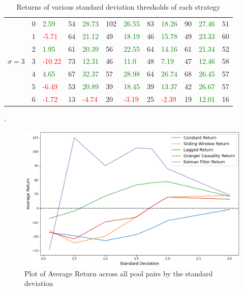 \begin{table}[!htb]
\begin{adjustwidth}{-0.8in}{-0.9in}
\begin{tabular}{|p{4em}|p{2em}|p{3em}|p{3em}|p{3em}|p{3em}|p{3em}|p{3em}|p{3em}|p{3em}|p{3em}|p{3em}|}
            & 0 & \textcolor{green}{2.59} & 54 & \textcolor{green}{28.73} & 102 & \textcolor{green}{26.55} & 83 & \textcolor{green}{18.26} & 90 & \textcolor{green}{27.46} & 51\\\cline{3-12}
            & 1 & \textcolor{red}{-5.71} & 64 & \textcolor{green}{21.12} & 49 & \textcolor{green}{18.19} & 46 & \textcolor{green}{15.78} & 49 & \textcolor{green}{23.33} & 60\\\cline{3-12}
            & 2 & \textcolor{green}{1.95} & 61 & \textcolor{green}{20.39} & 56 & \textcolor{green}{22.55} & 64 & \textcolor{green}{14.16} & 61 & \textcolor{green}{21.34} & 52\\\cline{3-12}
            $\sigma=3$& 3 & \textcolor{red}{-10.22} & 73 & \textcolor{green}{12.31} & 46 & \textcolor{green}{11.0} & 48 & \textcolor{green}{7.19} & 47 & \textcolor{green}{12.46} & 58\\\cline{3-12}
            & 4 & \textcolor{green}{4.65} & 67 & \textcolor{green}{32.37} & 57 & \textcolor{green}{28.98} & 64 & \textcolor{green}{26.74} & 68 & \textcolor{green}{26.45} & 57\\\cline{3-12}
            & 5 & \textcolor{red}{-6.49} & 53 & \textcolor{green}{20.89} & 39 & \textcolor{green}{18.45} & 39 & \textcolor{green}{13.37} & 42 & \textcolor{green}{26.67} & 57\\\cline{3-12}
            & 6 & \textcolor{red}{-1.72} & 13 & \textcolor{red}{-4.74} & 20 & \textcolor{red}{-3.19} & 25 & \textcolor{red}{-2.39} & 19 & \textcolor{green}{12.01} & 16\\\hline
        \end{tabular}
    \end{adjustwidth}
    \caption{Returns of various standard deviation thresholds of each strategy \label{tab:varying_sigma}}.
\end{table}

\begin{figure}[h!]
    \centering
    \includegraphics[width=1\textwidth]{evaluation/Images/VaryStd.png}
    \caption{Plot of Average Return across all pool pairs by the standard deviation}
    \label{fig:varyStd}
\end{figure}

